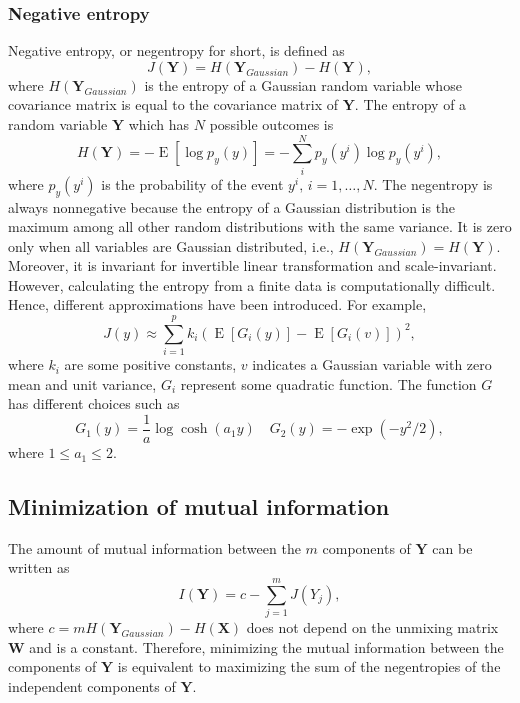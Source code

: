 \subsubsection{Negative entropy\label{Sec:DR:ICA:MnG:ne}}
Negative entropy, or negentropy for short, is defined as
\begin{equation}
	J(\mathbf{Y})=H(\mathbf{Y}_{Gaussian})-H(\mathbf{Y}),
\end{equation}
where $H(\mathbf{Y}_{Gaussian})$ is the entropy of a Gaussian random variable whose covariance matrix is equal to the covariance matrix of $\mathbf{Y}$. The entropy of a random variable $\mathbf{Y}$ which has $N$ possible outcomes is
\begin{equation}
	H(\mathbf{Y})=-\operatorname{E}\left[\log{p_y(y)}\right]=-\sum_i^N p_y(y^i)\log{p_y(y^i)},
\end{equation}
where $p_y(y^i)$ is the probability of the event $y^i,\, i=1,\dots, N$. The negentropy is always nonnegative because the entropy of a Gaussian distribution is the maximum among all other random distributions with the same variance. It is zero only when all variables are Gaussian distributed, i.e., $H(\mathbf{Y}_{Gaussian})=H(\mathbf{Y})$. Moreover, it is invariant for invertible linear transformation and scale-invariant. However, calculating the entropy from a finite data is computationally difficult. Hence, different approximations have been introduced. For example,
\begin{equation}
	J(y)\approx \sum_{i=1}^p k_i\left({\operatorname{E}}\left[G_i(y)\right]-{\operatorname{E}}\left[G_i(v)\right]\right)^2,
\end{equation} 
where $k_i$ are some positive constants, $v$ indicates a Gaussian variable with zero mean and unit variance, $G_i$ represent some quadratic function. The function $G$ has different choices such as
\begin{equation}
	G_1(y)=\frac{1}{a}\log\cosh (a_1y) \quad G_2(y)=-\exp(-y^2/2),
\end{equation}
where $1\leq a_1 \leq 2$.

\subsection{Minimization of mutual information\label{Sec:DR:ICA:MMI}}
The amount of mutual information between the $m$ components of $\mathbf{Y}$ can be written as
\begin{equation}
	I(\mathbf{Y})=c-\sum_{j=1}^m J(Y_j),
\end{equation}
where $c=mH(\mathbf{Y}_{Gaussian})-H(\mathbf{X})$ does not depend on the unmixing matrix $\mathbf{W}$ and is a constant. Therefore, minimizing the mutual information between the components of $\mathbf{Y}$ is equivalent to maximizing the sum of the negentropies of the independent components of $\mathbf{Y}$.

